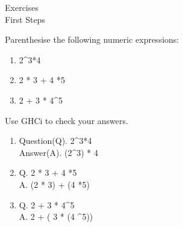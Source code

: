 \documentclass{article}
\newcommand\ExTitle{First Steps \ }
\newcommand\fullExTitle{Exercises \\ \ExTitle }
\begin{document}
\begin{Huge}
	\begin{center}
	\fullExTitle
	\end{center}
\end{Huge}

\begin{Exercise} 
	
  Parenthesise the following numeric expressions:  \\
	\begin{enumerate}
 	 \item
 		2\^{}3*4 \\
	 \item
 		2 * 3 + 4 *5\\
 
	 \item
 		2 + 3 * 4\^{}5\\
	\end{enumerate}  
   Use GHCi to check your answers. 
\end{Exercise}
\begin{Answer}
	\begin{enumerate}
 	 \item
 		Question(Q). 2\^{}3*4 \\
		Answer(A). (2\^{}3) * 4
	 \item
 		Q. 2 * 3 + 4 *5\\
                 A. (2 * 3) + (4 *5)
	 \item
 		Q. 2 + 3 * 4\^{}5\\
		A. 2 + ( 3 * (4 \^{}5))
	\end{enumerate}  
\end{Answer}
\end{document}
